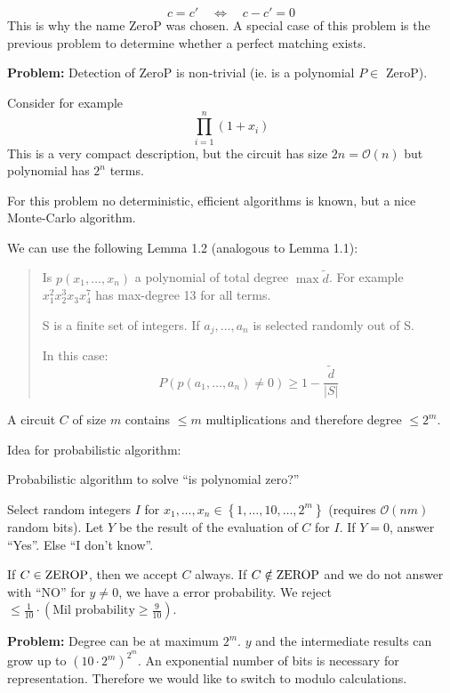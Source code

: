 \documentclass[a4paper]{article}
\newcommand{\cls}[1]{\rm{#1}}
\newcommand{\card}[1]{|#1|}
\newcommand{\set}[1]{\left\{#1\right\}}
\begin{document}
\[
    c = c' \quad \Leftrightarrow \quad c - c' = 0
\]
This is why the name \cls{ZeroP} was chosen. A special case of this problem is the previous problem to determine whether a perfect matching exists.

\textbf{Problem:} Detection of \cls{ZeroP} is non-trivial (ie. is a polynomial $P \in$ \cls{ZeroP}).

Consider for example
\[
  \prod_{i=1}^n (1 + x_i)
\]
This is a very compact description, but the circuit has size $2n = \mathcal{O}(n)$
but polynomial has $2^n$ terms.

For this problem no deterministic, efficient algorithms is known, but a
nice Monte-Carlo algorithm.

We can use the following Lemma 1.2 (analogous to Lemma 1.1):
\begin{quote}
  Is $p(x_1,\ldots,x_n)$ a polynomial of total degree $\max \tilde{d}$.
  For example $x_1^2 x_2^3 x_3 x_4^7$ has max-degree 13 for all terms.

  S is a finite set of integers. If $a_j,\ldots,a_n$ is selected randomly out of S.

  In this case:
  \[
    P(p(a_1, \ldots, a_n) \neq 0) \geq 1 - \frac{\tilde{d}}{\card{S}}
  \]
\end{quote}

A circuit $C$ of size $m$ contains $\leq m$ multiplications and therefore degree $\leq 2^m$.

Idea for probabilistic algorithm:
\begin{algorithm}
\caption{Probabilistic algorithm to solve ``is polynomial zero?''}
\begin{algorithmic}[1]
  \State
    Select random integers $I$ for $x_1, \ldots, x_n \in \set{1, \ldots, 10, \ldots, 2^m}$
    (requires $\mathcal{O}(nm)$ random bits).
  \State Let $Y$ be the result of the evaluation of $C$ for $I$.
  \State If $Y = 0$, answer ``Yes''. Else ``I don't know''.
\end{algorithmic}
\end{algorithm}

If $C \in \cls{ZEROP}$, then we accept $C$ always.
If $C \notin \cls{ZEROP}$ and we do not answer with ``NO'' for $y \neq 0$,
we have a error probability.
We reject $\leq \frac{1}{10} \cdot (\text{Mil probability} \geq \frac9{10})$.

\textbf{Problem:} Degree can be at maximum $2^m$. $y$ and the intermediate
results can grow up to $(10\cdot 2^m)^{2^m}$. An exponential number of bits
is necessary for representation. Therefore we would like to switch to modulo
calculations.
\end{document}
